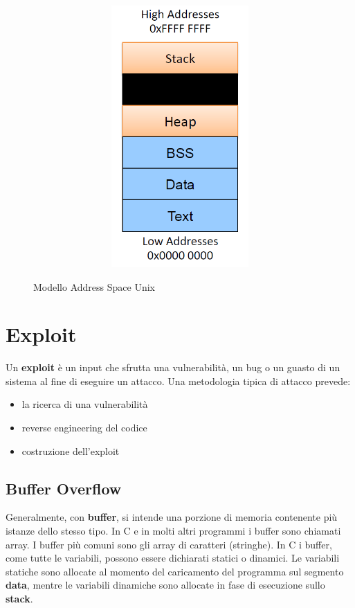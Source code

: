\begin{figure}[htbp]
	\centering
	\subfigure
	{\includegraphics[height=10cm, width=13cm, keepaspectratio]{Immagini/sistemi_operativi/addr_space_unix.png}}
	\caption{Modello Address Space Unix \label{fig:addr_space_unix}} 	
\end{figure}

\section{Exploit}
Un \textbf{exploit} è un input che sfrutta una vulnerabilità, un bug o un guasto di un sistema al fine di eseguire un attacco. Una metodologia tipica di attacco prevede:
\begin{itemize}
  \item la ricerca di una vulnerabilità
  \item reverse engineering del codice
  \item	costruzione dell'exploit
\end{itemize}

\subsection{Buffer Overflow}
Generalmente, con \textbf{buffer}, si intende una porzione di memoria contenente più istanze dello stesso tipo. In C e in molti altri programmi i buffer sono chiamati array. I buffer più comuni sono gli array di caratteri (stringhe).
In C i buffer, come tutte le variabili, possono essere dichiarati statici o dinamici. Le variabili statiche sono allocate al momento del caricamento del programma sul segmento \textbf{data}, mentre le variabili dinamiche sono allocate in fase di esecuzione sullo \textbf{stack}. \newline 

